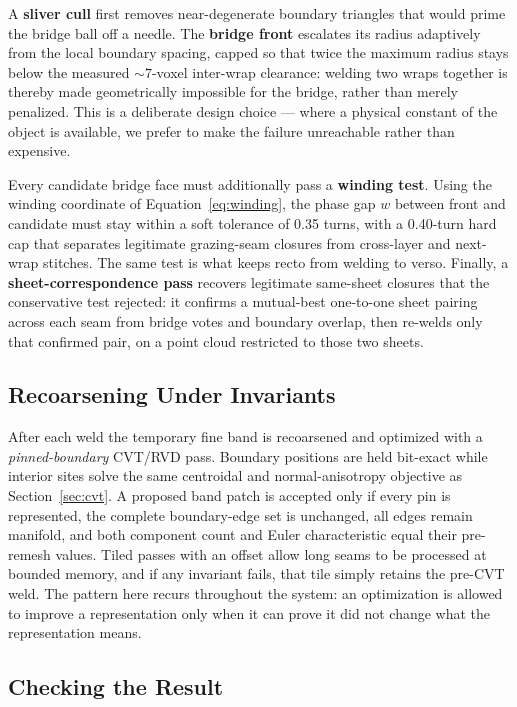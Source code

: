 A \textbf{sliver cull} first removes near-degenerate boundary triangles that would prime the bridge ball off a needle. The \textbf{bridge front} escalates its radius adaptively from the local boundary spacing, capped so that twice the maximum radius stays below the measured ${\sim}7$-voxel inter-wrap clearance: welding two wraps together is thereby made geometrically impossible for the bridge, rather than merely penalized. This is a deliberate design choice --- where a physical constant of the object is available, we prefer to make the failure unreachable rather than expensive.

Every candidate bridge face must additionally pass a \textbf{winding test}. Using the winding coordinate of Equation~\eqref{eq:winding}, the phase gap $w$ between front and candidate must stay within a soft tolerance of 0.35 turns, with a 0.40-turn hard cap that separates legitimate grazing-seam closures from cross-layer and next-wrap stitches. The same test is what keeps recto from welding to verso. Finally, a \textbf{sheet-correspondence pass} recovers legitimate same-sheet closures that the conservative test rejected: it confirms a mutual-best one-to-one sheet pairing across each seam from bridge votes and boundary overlap, then re-welds only that confirmed pair, on a point cloud restricted to those two sheets.

\subsection{Recoarsening Under Invariants}

After each weld the temporary fine band is recoarsened and optimized with a \emph{pinned-boundary} CVT/RVD pass. Boundary positions are held bit-exact while interior sites solve the same centroidal and normal-anisotropy objective as Section~\ref{sec:cvt}. A proposed band patch is accepted only if every pin is represented, the complete boundary-edge set is unchanged, all edges remain manifold, and both component count and Euler characteristic equal their pre-remesh values. Tiled passes with an offset allow long seams to be processed at bounded memory, and if any invariant fails, that tile simply retains the pre-CVT weld. The pattern here recurs throughout the system: an optimization is allowed to improve a representation only when it can prove it did not change what the representation means.

\subsection{Checking the Result}

